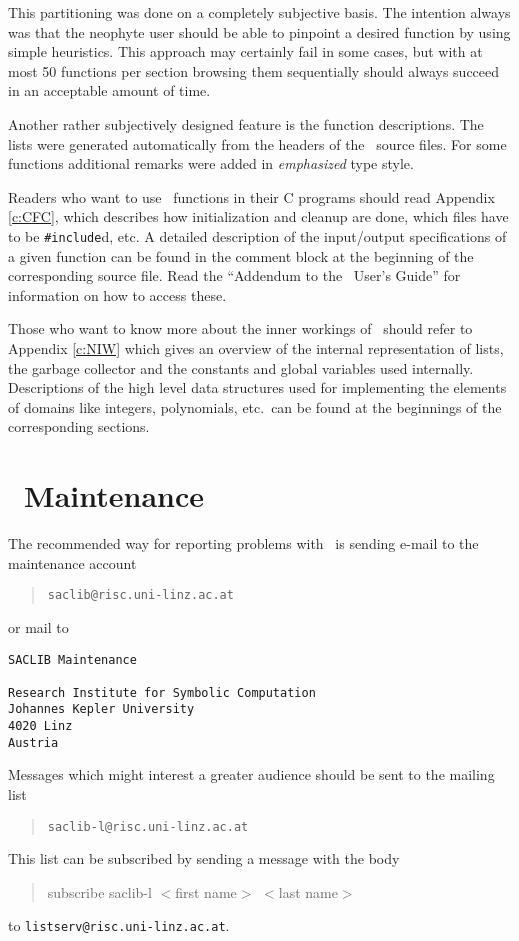 This partitioning was done on a completely subjective basis. The intention
always was that the neophyte user should be able to pinpoint a desired
function by using simple heuristics. This approach may certainly fail in
some cases, but with at most 50 functions per section browsing them
sequentially should always succeed in an acceptable amount of time.

Another rather subjectively designed feature is the function descriptions.
The lists were generated automatically from the headers of the \saclib\
source files. For some functions additional remarks were added in {\em
emphasized} type style.

Readers who want to use \saclib\ functions in their C programs should read
Appendix \ref{c:CFC}, which describes how initialization and cleanup are done,
which files have to be {\tt \#include}d, etc. A detailed description of the
input/output specifications of a given function can be found in the comment
block at the beginning of the corresponding source file. Read the ``Addendum
to the \saclib\ User's Guide'' for information on how to access these.

Those who want to know more about the inner workings of \saclib\ should
refer to Appendix \ref{c:NIW} which gives an overview of the internal
representation of lists, the garbage collector and the constants and global
variables used internally. Descriptions of the high level data structures
used for implementing the elements of domains like integers, polynomials,
etc.\ can be found at the beginnings of the corresponding sections.


\section{\saclib\ Maintenance}

The recommended way for reporting problems with \saclib\ is sending e-mail to
the maintenance account
\begin{quote}
{\tt saclib@risc.uni-linz.ac.at}
\end{quote}
or mail to 
\begin{verbatim}
SACLIB Maintenance

Research Institute for Symbolic Computation
Johannes Kepler University
4020 Linz
Austria
\end{verbatim}

Messages which might interest a greater audience should be sent to the mailing
list
\begin{quote}
{\tt saclib-l@risc.uni-linz.ac.at}
\end{quote}
This list can be subscribed by sending a message with the body
\begin{quote}
subscribe saclib-l $<$first name$>$ $<$last name$>$
\end{quote}
to {\tt listserv@risc.uni-linz.ac.at}.

